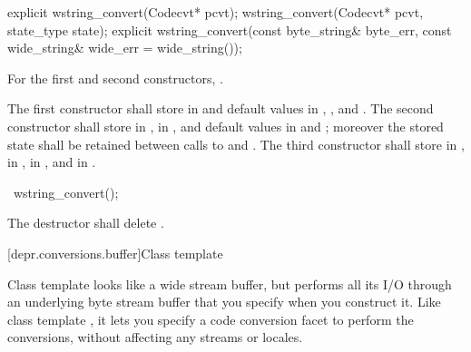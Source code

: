 %
\begin{itemdecl}
explicit wstring_convert(Codecvt* pcvt);
wstring_convert(Codecvt* pcvt, state_type state);
explicit wstring_convert(const byte_string& byte_err,
    const wide_string& wide_err = wide_string());
\end{itemdecl}

\begin{itemdescr}
\pnum
\requires
For the first and second constructors, .

\pnum
\effects
The first constructor shall store  in  and
default values in , , and
.
The second constructor shall store  in ,
 in , and default values in
 and ; moreover the
stored state shall be retained between calls to  and
.
The third constructor shall store  in ,
 in , 
in , and  in
.
\end{itemdescr}

%
\begin{itemdecl}
~wstring_convert();
\end{itemdecl}

\begin{itemdescr}
\pnum
\effects
The destructor shall delete .
\end{itemdescr}

[depr.conversions.buffer]{Class template }

\pnum
Class template  looks like a wide stream buffer, but
performs all its I/O through an underlying byte stream buffer that you
specify when you construct it. Like class template , it
lets you specify a code conversion facet to perform the conversions,
without affecting any streams or locales.

